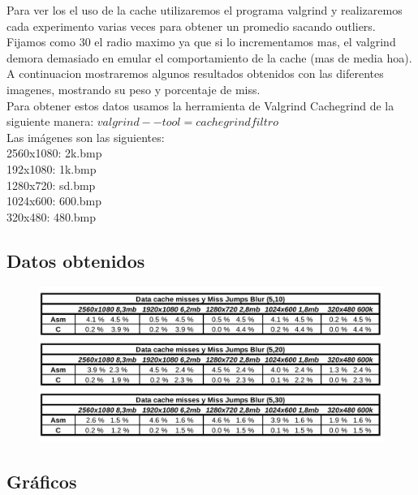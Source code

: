 Para ver los el uso de la cache utilizaremos el programa valgrind y realizaremos cada experimento varias veces para obtener un promedio sacando outliers. Fijamos como 30 el radio maximo ya que si lo incrementamos mas, el valgrind demora demasiado en emular el comportamiento de la cache (mas de media hoa). A continuacion mostraremos algunos resultados obtenidos con las diferentes imagenes, mostrando su peso y porcentaje de miss. \\
Para obtener estos datos usamos la herramienta de Valgrind Cachegrind de la siguiente manera: $valgrind --tool=cachegrind filtro$\\
Las imágenes son las siguientes:\\
2560x1080: 2k.bmp\\
192x1080: 1k.bmp\\
1280x720: sd.bmp\\
1024x600: 600.bmp\\
320x480: 480.bmp\\

\subsection{Datos obtenidos}

\begin{figure}[H]
\begin{center}
  \includegraphics[width=\linewidth]{cache/tabla.png}
\end{center}
\end{figure}

\subsection{Gráficos} 


